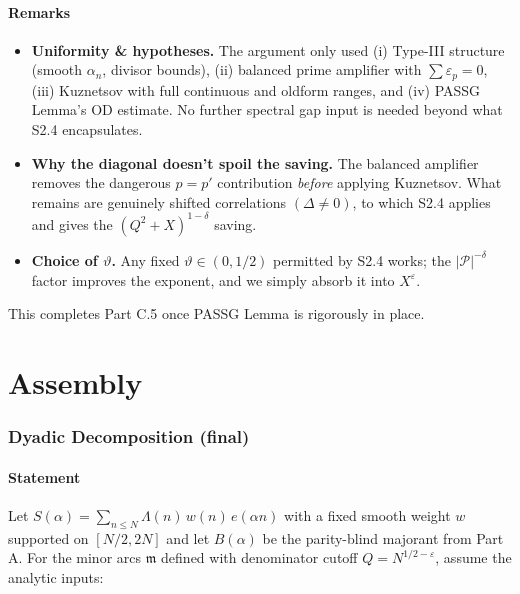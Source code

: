 \documentclass[11pt]{article}
\theoremstyle{definition}
\theoremstyle{remark}
\numberwithin{equation}{part}
\begin{document}
\subsection{Remarks}

\begin{itemize}
	\item \textbf{Uniformity \& hypotheses.} The argument only used (i) Type-III structure (smooth $\alpha_n$, divisor bounds), (ii) balanced prime amplifier with $\sum \varepsilon_p=0$, (iii) Kuznetsov with full continuous and oldform ranges, and (iv) PASSG Lemma’s OD estimate. No further spectral gap input is needed beyond what S2.4 encapsulates.

	\item \textbf{Why the diagonal doesn’t spoil the saving.} The balanced amplifier removes the dangerous $p=p'$ contribution \emph{before} applying Kuznetsov. What remains are genuinely shifted correlations $(\Delta\neq 0)$, to which S2.4 applies and gives the $(Q^2+X)^{1-\delta}$ saving.

	\item \textbf{Choice of $\vartheta$.} Any fixed $\vartheta\in(0,1/2)$ permitted by S2.4 works; the $|\mathcal P|^{-\delta}$ factor improves the exponent, and we simply absorb it into $X^{\varepsilon}$.
\end{itemize}

This completes Part C.5 once PASSG Lemma is rigorously in place.

\part{Assembly}
\section{Dyadic Decomposition (final)}

\subsection{Statement}

Let $S(\alpha)=\sum_{n\le N}\Lambda(n)\,w(n)\,e(\alpha n)$ with a fixed smooth weight $w$ supported on $[N/2,2N]$ and let $B(\alpha)$ be the parity-blind majorant from Part A. For the minor arcs $\mathfrak m$ defined with denominator cutoff $Q=N^{1/2-\varepsilon}$, assume the analytic inputs:
\end{document}

